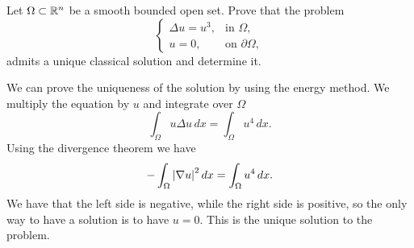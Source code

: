 \newpage
\begin{exercise}
    Let \(\Omega \subset \mathbb{R}^n\) be a smooth bounded open set. Prove that the problem
    \begin{equation*}
        \begin{cases}
            \Delta u = u^3, & \text{in } \Omega,          \\
            u = 0,          & \text{on } \partial \Omega,
        \end{cases}
    \end{equation*}
    admits a unique classical solution and determine it.
\end{exercise}
We can prove the uniqueness of the solution by using the energy method. We multiply the equation by \(u\) and integrate over \(\Omega\)
\[
    \int_\Omega u \Delta u \, dx = \int_\Omega u^4 \, dx.
\]
Using the divergence theorem we have
\[
    -\int_\Omega \abs{\nabla u}^2 \, dx = \int_\Omega u^4 \, dx.
\]
We have that the left side is negative, while the right side is positive, so
the only way to have a solution is to have \(u = 0\). This is the unique
solution to the problem.

\newpage
